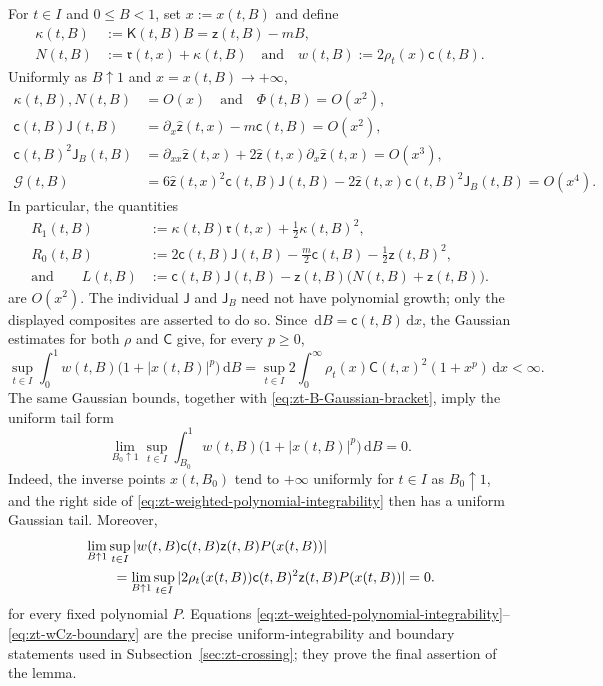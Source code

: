 \documentclass[10pt]{amsart}
\theoremstyle{definition}
\theoremstyle{remark}
\numberwithin{equation}{section}
\newcommand{\1}{\mathbf 1}
\newcommand{\cG}{\mathcal G}
\newcommand{\dd}{\,\mathrm d}
\begin{document}
For $t\in I$ and $0\leq B<1$, set $x:=x(t,B)$ and define
\begin{align*}
 \kappa(t,B)&:=\mathsf K(t,B)B=\mathsf z(t,B)-mB,\\
 N(t,B)&:=\mathfrak r(t,x)+\kappa(t,B)
 \quad\text{and}\quad w(t,B):=2\rho_t(x)\mathsf c(t,B).
\end{align*}
Uniformly as $B\uparrow1$ and $x=x(t,B)\to+\infty$,
\begin{align*}
 \kappa(t,B),N(t,B)&=O(x)\quad\text{and}\quad \Phi(t,B)=O(x^2),\\
 \mathsf c(t,B)\mathsf J(t,B)&=\partial_x\widehat{\mathsf z}(t,x)-m\mathsf c(t,B)=O(x^2),\\
 \mathsf c(t,B)^2\mathsf J_B(t,B)&=\partial_{xx}\widehat{\mathsf z}(t,x)+2\widehat{\mathsf z}(t,x)\partial_x\widehat{\mathsf z}(t,x)=O(x^3),\\
 \cG(t,B)&=6\widehat{\mathsf z}(t,x)^2\mathsf c(t,B)\mathsf J(t,B)-2\widehat{\mathsf z}(t,x)\mathsf c(t,B)^2\mathsf J_B(t,B)=O(x^4).
\end{align*}
In particular, the quantities
\begin{align*}
 R_1(t,B)&:=\kappa(t,B)\mathfrak r(t,x)+\frac12\kappa(t,B)^2,\\
 R_0(t,B)&:=2\mathsf c(t,B)\mathsf J(t,B)-\frac m2\mathsf c(t,B)-\frac12\mathsf z(t,B)^2,\\
 \text{and}\qquad L(t,B)&:=\mathsf c(t,B)\mathsf J(t,B)-\mathsf z(t,B)\bigl(N(t,B)+\mathsf z(t,B)\bigr).
\end{align*}
are $O(x^2)$. The individual $\mathsf J$ and $\mathsf J_B$ need not have polynomial growth; only the displayed composites are asserted to do so. Since $\dd B=\mathsf c(t,B)\dd x$, the Gaussian estimates for both $\rho$ and $\mathsf C$ give, for every $p\geq0$,
\begin{equation}
 \sup_{t\in I}\int_0^1w(t,B)
   \bigl(1+|x(t,B)|^p\bigr)\dd B
 =\sup_{t\in I}2\int_0^\infty\rho_t(x)\mathsf C(t,x)^2(1+x^p)\dd x<\infty.
 \label{eq:zt-weighted-polynomial-integrability}
\end{equation}
The same Gaussian bounds, together with \eqref{eq:zt-B-Gaussian-bracket}, imply the uniform tail form
\begin{equation}
 \lim_{B_0\uparrow1}\sup_{t\in I}
 \int_{B_0}^1w(t,B)\bigl(1+|x(t,B)|^p\bigr)\dd B=0.
 \label{eq:zt-weighted-uniform-tail}
\end{equation}
Indeed, the inverse points $x(t,B_0)$ tend to $+\infty$ uniformly for $t\in I$ as $B_0\uparrow1$, and the right side of \eqref{eq:zt-weighted-polynomial-integrability} then has a uniform Gaussian tail. Moreover,
\begin{align}
 &\lim_{B\uparrow1}\sup_{t\in I}|w(t,B)\mathsf c(t,B)\mathsf z(t,B)P(x(t,B))| \notag\\
 &\qquad=\lim_{B\uparrow1}\sup_{t\in I}|2\rho_t(x(t,B))\mathsf c(t,B)^2\mathsf z(t,B)P(x(t,B))|=0.
 \label{eq:zt-wCz-boundary}
\end{align}
for every fixed polynomial $P$.  Equations \eqref{eq:zt-weighted-polynomial-integrability}--\eqref{eq:zt-wCz-boundary} are the precise uniform-integrability and boundary statements used in Subsection~\ref{sec:zt-crossing}; they prove the final assertion of the lemma.
\end{document}
